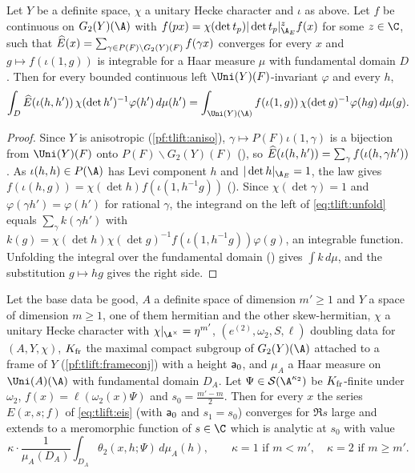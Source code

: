 \begin{proposition}[Unfolding]\label{pf:tlift:unfold}
Let $Y$ be a definite space, $\chi$ a unitary Hecke character and $\iota$ as above. Let $f$ be continuous on
$G_2(Y)(\A)$ with $f(px)=\chi(\det t_p)|\det t_p|^z_{\tliftAE}f(x)$ for some $z\in\C$, such that
$\widehat{E}(x)=\sum_{\gamma\in P(F)\backslash G_2(Y)(F)}f(\gamma x)$ converges for every $x$ and $g\mapsto f(\iota(1,g))$ is
integrable for a Haar measure $\mu$ with fundamental domain $D$. Then for every bounded continuous left
$\Uni(Y)(F)$-invariant $\varphi$ and every $h$,
\begin{equation}\label{eq:tlift:unfold}
  \int_D\tliftE(\iota(h,h'))\,\chi(\det h')^{-1}\varphi(h')\,d\mu(h')
  =\int_{\Uni(Y)(\A)}f(\iota(1,g))\,\chi(\det g)^{-1}\varphi(hg)\,d\mu(g).
\end{equation}
\end{proposition}

\begin{proof}
Since $Y$ is anisotropic (\cref{pf:tlift:aniso}), $\gamma\mapsto P(F)\iota(1,\gamma)$ is a bijection from $\Uni(Y)(F)$
onto $P(F)\backslash G_2(Y)(F)$ (), so
$\widehat{E}(\iota(h,h'))=\sum_{\gamma}f(\iota(h,\gamma h'))$. As $\iota(h,h)\in P(\A)$ has Levi component $h$ and
$|\det h|_{\tliftAE}=1$, the law gives $f(\iota(h,g))=\chi(\det h)f(\iota(1,h^{-1}g))$
(). Since $\chi(\det\gamma)=1$ and $\varphi(\gamma h')=\varphi(h')$ for rational
$\gamma$, the integrand on the left of \eqref{eq:tlift:unfold} equals $\sum_\gamma k(\gamma h')$ with
$k(g)=\chi(\det h)\chi(\det g)^{-1}f(\iota(1,h^{-1}g))\varphi(g)$, an integrable function. Unfolding the integral
over the fundamental domain () gives $\int k\,d\mu$, and the
substitution $g\mapsto hg$ gives the right side.
\end{proof}

\begin{theorem}\label{pf:tlift:swstd}
Let the base data be good, $A$ a definite space of dimension $m'\ge1$ and $Y$ a space of dimension
$m\ge1$, one of them hermitian and the other skew-hermitian, $\chi$ a unitary Hecke character with
$\chi|_{\A^\times}=\eta^{m'}$, $(e^{(2)},\omega_2,S,\ell)$ doubling data for $(A,Y,\chi)$, $K_{\mathrm{fr}}$ the maximal compact
subgroup of $G_2(Y)(\A)$ attached to a frame of $Y$ (\cref{pf:tlift:frameconj}) with a height $\mathsf{a}_0$,
and $\mu_A$ a Haar measure on $\Uni(A)(\A)$ with fundamental domain $D_A$. Let
$\Psi\in\tliftS(\A^{\kappa_2})$ be $K_{\mathrm{fr}}$-finite under $\omega_2$, $f(x)=\ell(\omega_2(x)\Psi)$ and $s_0=\frac{m'-m}2$.
Then for every $x$ the series $E(x,s;f)$ of \eqref{eq:tlift:eis} (with $\mathsf{a}_0$ and $s_1=s_0$) converges
for $\Re s$ large and extends to a meromorphic function of $s\in\C$ which is analytic at $s_0$ with value
\[
  \kappa\cdot\frac1{\mu_A(D_A)}\int_{D_A}\theta_2(x,h;\Psi)\,d\mu_A(h),\qquad\kappa=1\text{ if }m<m',\quad\kappa=2\text{ if }m\ge m'.
\]
\end{theorem}

